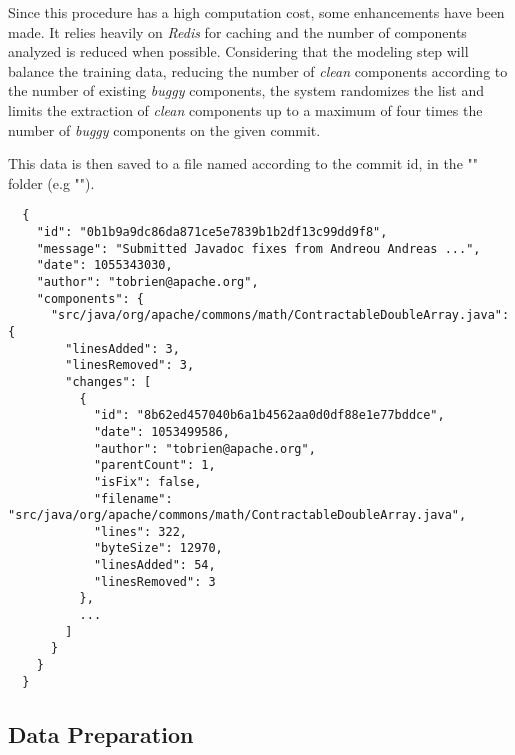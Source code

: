 Since this procedure has a high computation cost, some enhancements have been made. It relies heavily on \emph{Redis} for caching 
and the number of components analyzed is reduced when possible. Considering that the modeling step will balance the training data, 
reducing the number of \emph{clean} components according to the number of existing \emph{buggy} components, the system randomizes the list and
limits the extraction of \emph{clean} components up to a maximum of four times the number of \emph{buggy} components on the given commit.



This data is then saved to a file named according to the commit id, in the "" folder (e.g "").

\begin{lstlisting}
  {
    "id": "0b1b9a9dc86da871ce5e7839b1b2df13c99dd9f8",
    "message": "Submitted Javadoc fixes from Andreou Andreas ...",
    "date": 1055343030,
    "author": "tobrien@apache.org",
    "components": {
      "src/java/org/apache/commons/math/ContractableDoubleArray.java": {
        "linesAdded": 3,
        "linesRemoved": 3,
        "changes": [
          {
            "id": "8b62ed457040b6a1b4562aa0d0df88e1e77bddce",
            "date": 1053499586,
            "author": "tobrien@apache.org",
            "parentCount": 1,
            "isFix": false,
            "filename": "src/java/org/apache/commons/math/ContractableDoubleArray.java",
            "lines": 322,
            "byteSize": 12970,
            "linesAdded": 54,
            "linesRemoved": 3
          },
          ...
        ]
      }
    }
  }
\end{lstlisting}



\subsection{Data Preparation}

